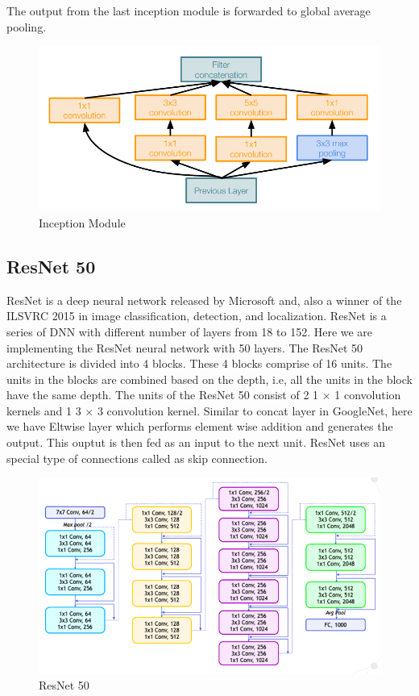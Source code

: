 The output from the last inception module is forwarded to global average pooling.

\begin{figure}[h!]
    \centering
    \includegraphics[scale=0.4]{googlenet}
    \caption{Inception Module}
\end{figure}

\subsection{ResNet 50}
ResNet is a deep neural network released by Microsoft and, also a winner of the ILSVRC 2015 in image classification, detection, and localization. ResNet is a series of DNN with different number of layers from 18 to 152. Here we are implementing the ResNet neural network with 50 layers.
\newline
The ResNet 50 architecture is divided into 4 blocks. These 4 blocks comprise of 16 units. The units in the blocks are combined based on the depth, i.e, all the units in the block have the same depth. The units of the ResNet 50 consist of 2 1 $\times$ 1 convolution kernels and 1 3 $\times$ 3 convolution kernel. Similar to concat layer in GoogleNet, here we have Eltwise layer which performs element wise addition and generates the output. This ouptut is then fed as an input to the next unit. ResNet uses an special type of connections called as skip connection.  

\begin{figure}[h!]
\centering
\includegraphics[scale=0.5]{img/Resne50arch.png}
\caption{ResNet 50}
\label{fig:resnet_50}
\end{figure}


